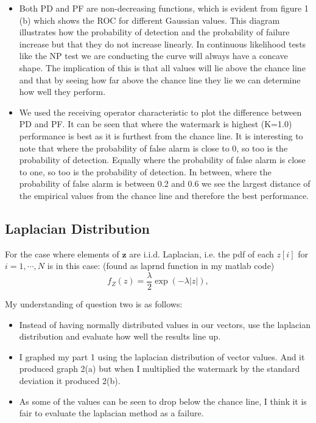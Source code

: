 \documentclass[]{assignment}
\begin{document}
\begin{itemize}
\item Both PD and PF are non-decreasing functions, which is evident from figure 1 (b) which shows the ROC for different Gaussian values. This diagram illustrates how the probability of detection and the probability of failure increase but that they do not increase linearly. In continuous likelihood tests like the NP test we are conducting the curve will always have a concave shape. The implication of this is that all values will lie above the chance line and that by seeing how far above the chance line they lie we can determine how well they perform.

\item We used the receiving operator characteristic to plot the difference between PD and PF. It can be seen that where the watermark is highest (K=1.0) performance is best as it is furthest from the chance line. It is interesting to note that where the probability of false alarm is close to 0, so too is the probability of detection. Equally where the probability of false alarm is close to one, so too is the probability of detection. In between, where the probability of false alarm is between 0.2 and 0.6 we see the largest distance of the empirical values from the chance line and therefore the best performance.

\end{itemize}

\clearpage
\subsection{Laplacian Distribution}



For the case where elements of $\mathbf{z}$ are i.i.d. Laplacian, i.e. the pdf of each $z[i]$ for $i=1,\cdots, N$ is in this case: (found as laprnd function in my matlab code)
\[f_Z(z)=\frac{\lambda}{2} \exp(-\lambda|z|),\]

My understanding of question two is as follows: 

\begin{itemize}
\item Instead of having normally distributed values in our vectors, use the laplacian distribution and evaluate how well the results line up. 

\item I graphed my part 1 using the laplacian distribution of vector values. And it produced graph 2(a) but when I multiplied the watermark by the standard deviation it produced 2(b). 

\item As some of the values can be seen to drop below the chance line, I think it is fair to evaluate the laplacian method as a failure. 

\end{itemize}
\end{document}

